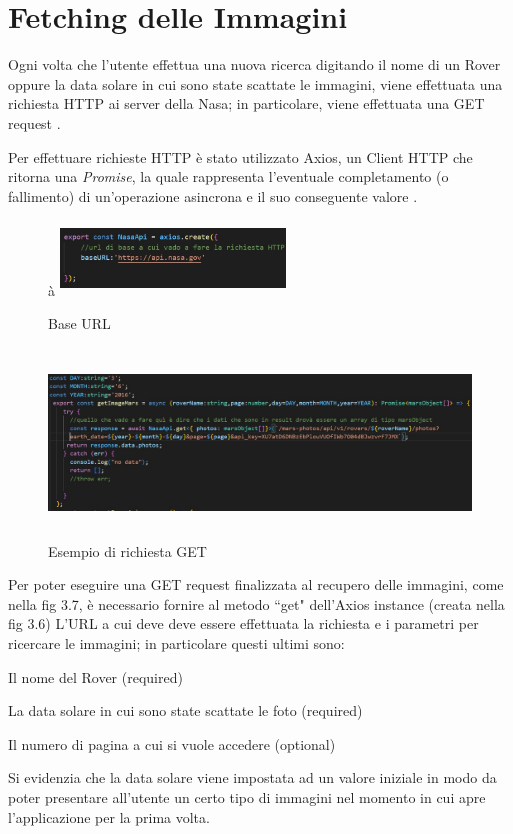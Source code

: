 \section{Fetching delle Immagini}
Ogni volta che l'utente effettua una nuova ricerca digitando il nome di un Rover oppure la data solare in cui sono state scattate le immagini, viene effettuata una richiesta HTTP ai server della Nasa; in particolare, viene effettuata una GET request \cite{Axios}.

Per effettuare richieste HTTP \`e stato utilizzato Axios, un Client HTTP che ritorna una \textit{Promise}, la quale rappresenta l'eventuale completamento {}(o fallimento) di un'operazione asincrona e il suo conseguente valore \cite{Promise}.
\begin{figure}[h]
    \centering\`a
    \includegraphics[width=6cm, height=2cm]{images/baseUrl.jpg}
    \caption[differenzeiteot]{Base URL}
    \label{fig:baseUrl}
\end{figure}
\begin{figure}[h]
    \centering
    \includegraphics[width=14cm, height=5cm]{images/getRequest.jpg}
    \caption[differenzeiteot]{Esempio di richiesta GET}
    \label{fig:getRequest}
\end{figure}

Per poter eseguire una GET request finalizzata al recupero delle immagini, come nella fig 3.7, \`e necessario fornire al metodo ``get" dell'Axios instance {}(creata nella fig 3.6) L'URL a cui deve deve essere effettuata la richiesta e i parametri per ricercare le immagini; in particolare questi ultimi sono:
\begin{list}{*}{}
    \item Il nome del Rover {}(required)
    \item La data solare in cui sono state scattate le foto {}(required)
    \item Il numero di pagina a cui si vuole accedere {}(optional)
\end{list}
Si evidenzia che la data solare viene impostata ad un valore iniziale in modo da poter presentare all'utente un certo tipo di immagini nel momento in cui apre l'applicazione per la prima volta.

